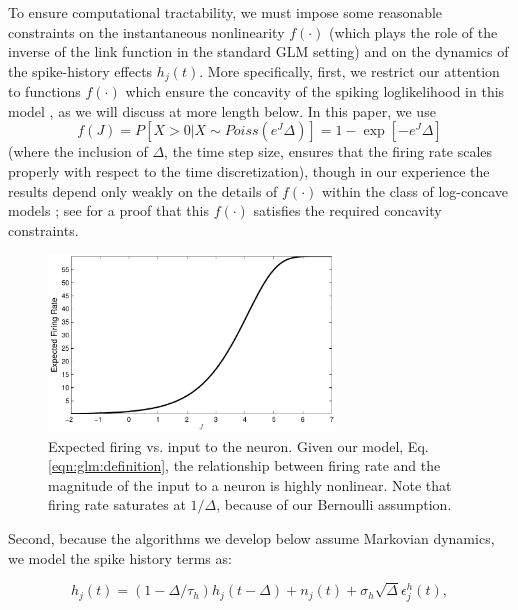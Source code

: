 To ensure computational tractability, we must impose some reasonable constraints on the instantaneous nonlinearity $f(\cdot)$ (which plays the role of the inverse of the link function in the standard GLM setting) and on the dynamics of the spike-history effects $h_j(t)$. More specifically, first, we restrict our attention to functions $f(\cdot)$ which ensure the concavity of the spiking loglikelihood in this model \cite{PAN04c}, as we will discuss at more length below. In this paper, we use \begin{equation} f(J) = P[X>0 | X \sim Poiss(e^J \Delta)] = 1 - \exp[-e^J \Delta] \end{equation} (where the inclusion of $\Delta$, the time step size, ensures that the firing rate scales properly with respect to the time discretization), though in our experience the results depend only weakly on the details of $f(\cdot)$ within the class of log-concave models \cite{LD89,PAN04c}; see \cite{Escola07} for a proof that this $f(\cdot)$ satisfies the required concavity constraints.

\begin{figure}[h]
\centering
\includegraphics[width=3in]{../figs/fr_vs_J}
\caption{Expected firing vs. input to the neuron.  Given our model, Eq. \ref{eqn:glm:definition}, the relationship between firing rate and the magnitude of the input to a neuron is highly nonlinear.  Note that firing rate saturates at $1/\Delta$, because of our Bernoulli assumption.}
\label{fig:egfluor}
\end{figure}

Second, because the algorithms we develop below assume Markovian dynamics, we model the spike history terms as: 

\begin{equation} \label{eqn:h:definition} h_j(t) = (1- \Delta/\tau_h) h_j(t- \Delta) +n_j(t) + \sigma_h \sqrt{\Delta} \epsilon^h_j(t), \end{equation} 
	
